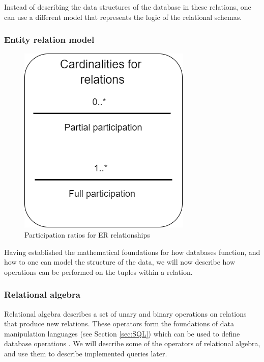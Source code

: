 Instead of describing the data structures of the database in these relations, one can use a different model that represents the logic of the relational schemas.

\subsubsection{Entity relation model}\label{sec:EntityRelationModel}
\begin{figure}
    \centering
    \includegraphics[scale=0.5]{Images/cardinalities.png}
    \caption{Participation ratios for ER relationships}
    \label{fig:ERDiagram_Cardinality}
\end{figure}


Having established the mathematical foundations for how databases function, and how to one can model the structure of the data, we will now describe how operations can be performed on the tuples within a relation.

\subsubsection{Relational algebra}\label{sec:relationalAlgebra}
Relational algebra describes a set of unary and binary operations on relations that produce new relations.
These operators form the foundations of data manipulation languages (see Section \ref{sec:SQL}) which can be used to define database operations \cite[Chapter 6.2]{DBSBook}.
We will describe some of the operators of relational algebra, and use them to describe implemented queries later.

